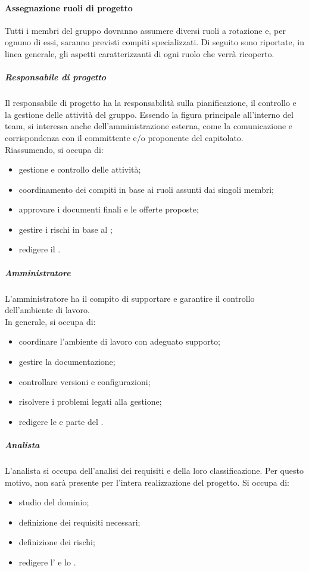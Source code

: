     	\paragraph{Assegnazione ruoli di progetto}
    	Tutti i membri del gruppo dovranno assumere diversi ruoli a rotazione e, per ognuno di essi, saranno previsti compiti specializzati. Di seguito sono riportate, in linea generale, gli aspetti caratterizzanti di ogni ruolo che verrà ricoperto.

    		\subparagraph{Responsabile di progetto}
    		Il responsabile di progetto ha la responsabilità sulla pianificazione, il controllo e la gestione delle attività del gruppo. Essendo la figura principale all'interno del team, si interessa anche dell'amministrazione esterna, come la comunicazione e corrispondenza con il committente e/o proponente del capitolato.\\
    		Riassumendo, si occupa di:
    		\begin{itemize}
    			\item gestione e controllo delle attività;
    			\item coordinamento dei compiti in base ai ruoli assunti dai singoli membri;
    			\item approvare i documenti finali e le offerte proposte;
    			\item gestire i rischi in base al ;
    			\item redigere il .
    		\end{itemize}

    		\subparagraph{Amministratore}
    		L'amministratore ha il compito di supportare e garantire il controllo dell'ambiente di lavoro.\\
    		In generale, si occupa di:
    		\begin{itemize}
    			\item coordinare l'ambiente di lavoro con adeguato supporto;
    			\item gestire la documentazione;
    			\item controllare versioni e configurazioni;
    			\item risolvere i problemi legati alla gestione;
    			\item redigere le  e parte del .
    		\end{itemize}

    		\subparagraph{Analista}
    		L'analista si occupa dell'analisi dei requisiti e della loro classificazione. Per questo motivo, non sarà presente per l'intera realizzazione del progetto.
    		Si occupa di:
    		\begin{itemize}
    			\item studio del dominio;
    			\item definizione dei requisiti necessari;
    			\item definizione dei rischi;
    			\item redigere l' e lo .
    		\end{itemize}

